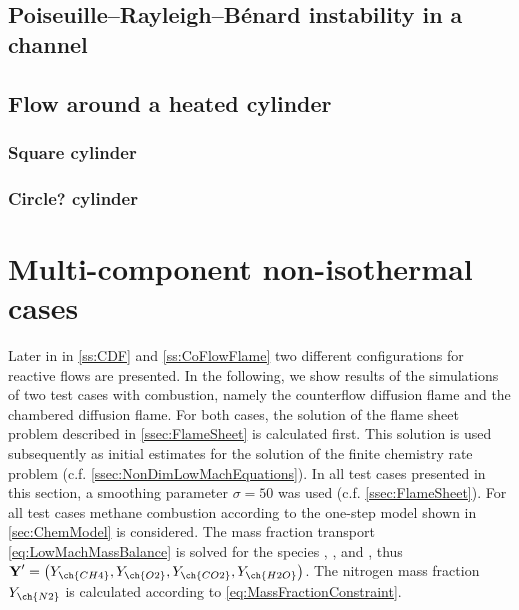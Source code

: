 




\subsection{Poiseuille–Rayleigh–Bénard instability in a channel}
\blindtext[5]


\subsection{Flow around a heated cylinder}
\subsubsection{Square cylinder}
\blindtext[5]
\subsubsection{Circle? cylinder}
\blindtext[5]



\section{Multi-component non-isothermal cases}\label{sec:MultCompNonIsothermCase}
Later in in \cref{ss:CDF} and \cref{ss:CoFlowFlame} two different configurations for reactive flows are presented.
In the following, we show results of the simulations of two test cases with combustion, namely the counterflow diffusion flame and the chambered diffusion flame. For both cases, the solution of the flame sheet problem described in \cref{ssec:FlameSheet} is calculated first. This solution is used subsequently as initial estimates for the solution of the finite chemistry rate problem (c.f. \cref{ssec:NonDimLowMachEquations}). In all test cases presented in this section, a smoothing parameter $\sigma = 50$ was used (c.f. \cref{ssec:FlameSheet}). For all test cases methane combustion according to the one-step model shown in \cref{sec:ChemModel} is considered. The mass fraction transport \cref{eq:LowMachMassBalance} is solved for the species , ,  and , thus $\vec{Y}' = \left(Y_{\ch{CH4}},Y_{\ch{O2}},Y_{\ch{CO2}},Y_{\ch{H2O}}\right)$. The nitrogen mass fraction $Y_{\ch{N2}}$ is calculated according to \cref{eq:MassFractionConstraint}.







\FloatBarrier
